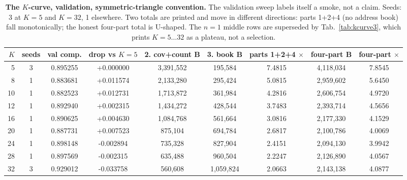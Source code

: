 \documentclass{article} %
\begin{document}
\begin{table}[h]
\centering\small
\caption{\textbf{The $K$-curve, validation, symmetric-triangle convention.} The validation sweep
labels itself a smoke, not a claim. Seeds: 3 at $K=5$ and $K=32$, 1 elsewhere. Two totals are %
printed and move in different directions: parts 1+2+4 (no address book) fall monotonically; the
honest four-part total is U-shaped. The $n=1$ middle rows are superseded by Tab.~\ref{tab:kcurve3},
which prints $K=5\ldots32$ as a plateau, not a selection. %
}
\label{tab:kcurve}
\setlength{\tabcolsep}{2.4pt}
\begin{adjustbox}{max width=\linewidth}\begin{tabular}{rcccccccc}
\toprule
$K$ & seeds & val comp. & drop vs $K{=}5$ & 2. cov+count B & 3. book B & parts 1+2+4 $\times$ & four-part B & four-part $\times$ \\
\midrule
5 & 3 & 0.895255 & +0.000000 & 3,391,552 & 195,584 & 7.4815 & 4,118,034 & 7.8545 \\
8 & 1 & 0.883681 & +0.011574 & 2,133,280 & 295,424 & 5.0815 & 2,959,602 & 5.6450 \\
10 & 1 & 0.882523 & +0.012731 & 1,713,872 & 361,984 & 4.2816 & 2,606,754 & 4.9720 \\
12 & 1 & 0.892940 & +0.002315 & 1,434,272 & 428,544 & 3.7483 & 2,393,714 & 4.5656 \\
16 & 1 & 0.890625 & +0.004630 & 1,084,768 & 561,664 & 3.0816 & 2,177,330 & 4.1529 \\
20 & 1 & 0.887731 & +0.007523 & 875,104 & 694,784 & 2.6817 & 2,100,786 & 4.0069 \\
24 & 1 & 0.898148 & -0.002894 & 735,328 & 827,904 & 2.4151 & 2,094,130 & 3.9942 \\
28 & 1 & 0.897569 & -0.002315 & 635,488 & 960,504 & 2.2247 & 2,126,890 & 4.0567 \\
32 & 3 & 0.929012 & -0.033758 & 560,608 & 1,059,824 & 2.0663 & 2,143,138 & 4.0877 \\
\bottomrule
\end{tabular}\end{adjustbox}
\end{table}
\end{document}

